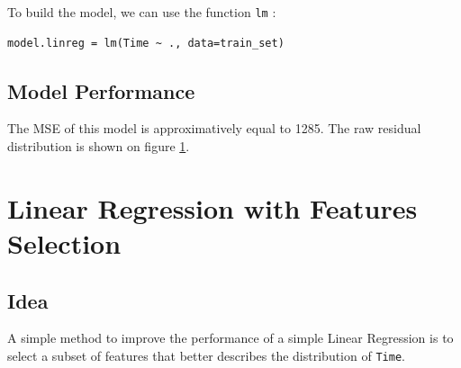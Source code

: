 \documentclass[]{report}
\begin{document}
To build the model, we can use the function \texttt{lm} :
\begin{lstlisting}
model.linreg = lm(Time ~ ., data=train_set)
\end{lstlisting}


\subsection{Model Performance}
The MSE of this model is approximatively equal to 1285. The raw residual distribution is shown on figure \ref{fig:linreg_hist}. 

\begin{figure}[!h]
	\centering
	
	\caption{}
	\label{fig:linreg_hist}
\end{figure}

\section{Linear Regression with Features Selection}
\subsection{Idea}
A simple method to improve the performance of a simple Linear Regression is to select a subset of features that better describes the distribution of \texttt{Time}.
\end{document}
